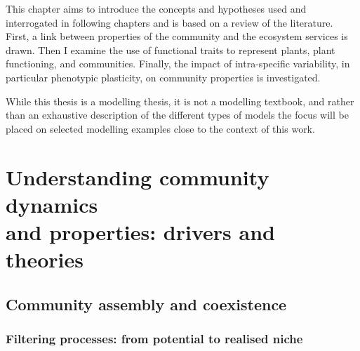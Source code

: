 \begin{fullwidth}
This chapter aims to introduce the concepts and hypotheses used and interrogated in following chapters and is based on a review of the literature. First, a link between properties of the community and the ecosystem services is drawn. Then I examine the use of functional traits to represent plants, plant functioning, and communities. Finally, the impact of intra-specific variability, in particular phenotypic plasticity, on community properties is investigated.

While this thesis is a modelling thesis, it is not a modelling textbook, and rather than an exhaustive description of the different types of models the focus will be placed on selected modelling examples close to the context of this work.
\end{fullwidth}

\chapter{Understanding community dynamics\\and properties: drivers and theories}\label{chapter:coexistence}





\section{Community assembly and coexistence}



\subsection{Filtering processes: from potential to realised niche}


